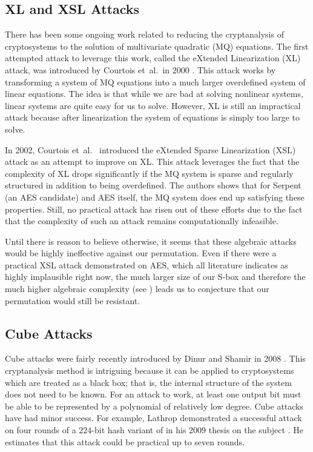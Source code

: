 \subsection{XL and XSL Attacks}
There has been some ongoing work related to reducing the cryptanalysis of cryptosystems to the solution of multivariate quadratic (MQ) equations.
The first attempted attack to leverage this work, called the eXtended Linearization (XL) attack, was introduced by Courtois et~al.\ in 2000 \cite{Courtois2000_XL}.
This attack works by transforming a system of MQ equations into a much larger overdefined system of linear equations.
The idea is that while we are bad at solving nonlinear systems, linear systems are quite easy for us to solve.
However, XL is still an impractical attack because after linearization the system of equations is simply too large to solve.

In 2002, Courtois et~al.\ \cite{Courtois2002_XSL} introduced the eXtended Sparse Linearization (XSL) attack as an attempt to improve on XL.
This attack leverages the fact that the complexity of XL drops significantly if the MQ system is sparse and regularly structured in addition to being overdefined.
The authors shows that for Serpent (an AES candidate) and AES itself, the MQ system does end up satisfying these properties.
Still, no practical attack has risen out of these efforts due to the fact that the complexity of such an attack remains computationally infeasible.

Until there is reason to believe otherwise, it seems that these algebraic attacks would be highly ineffective against our permutation.
Even if there were a practical XSL attack demonstrated on AES, which all literature indicates as highly implausible right now, the much larger size of our S-box and therefore the much higher algebraic complexity (see \cite{Wood2013_SboxThesis}) leads us to conjecture that our permutation would still be resistant.

\subsection{Cube Attacks}
Cube attacks were fairly recently introduced by Dinur and Shamir in 2008 \cite{Dinur2009_Cube}.
This cryptanalysis method is intriguing because it can be applied to cryptosystems which are treated as a black box; that is, the internal structure of the system does not need to be known.
For an attack to work, at least one output bit must be able to be represented by a polynomial of relatively low degree.
Cube attacks have had minor success.
For example, Lathrop demonstrated a successful attack on four rounds of a $224$-bit hash variant of \Keccak in his 2009 thesis on the subject \cite{Lathrop2009_CubeAttacks}.
He estimates that this attack could be practical up to seven rounds.

